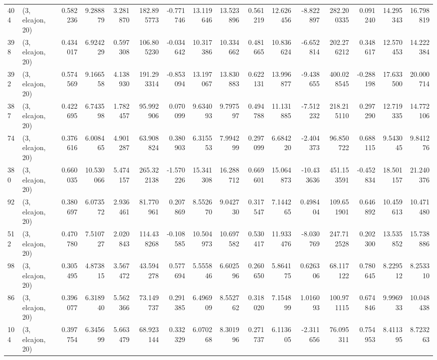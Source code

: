 \begin{tabular}{llrrrrrrrrrrrrrr}
404 &  (3, elcajon, 20) &   0.582236 &   9.288879 &   3.281870 &   182.895773 &  -0.771746 &  13.119646 &  13.523896 &  0.561219 &  12.626456 &  -8.822897 &    282.200335 &   0.091240 &   14.295343 &   16.798819 \\
398 &  (3, elcajon, 20) &   0.434017 &   6.924229 &   0.597308 &   106.805230 &  -0.034642 &  10.317386 &  10.334662 &  0.481665 &  10.836624 &  -6.652814 &    202.276212 &   0.348617 &   12.570453 &   14.222384 \\
392 &  (3, elcajon, 20) &   0.574569 &   9.166558 &   4.138930 &   191.293314 &  -0.853094 &  13.197067 &  13.830883 &  0.622131 &  13.996877 &  -9.438655 &    400.028545 &  -0.288198 &   17.633500 &   20.000714 \\
387 &  (3, elcajon, 20) &   0.422695 &   6.743598 &   1.782457 &    95.992906 &   0.070099 &   9.634093 &   9.797597 &  0.494788 &  11.131885 &  -7.512232 &    218.215110 &   0.297290 &   12.719335 &   14.772106 \\
74  &  (3, elcajon, 20) &   0.376616 &   6.008465 &   4.901287 &    63.908824 &   0.380903 &   6.315553 &   7.994299 &  0.297099 &   6.684220 &  -2.404373 &     96.850722 &   0.688115 &    9.543045 &    9.841276 \\
380 &  (3, elcajon, 20) &   0.660035 &  10.530066 &   5.474157 &   265.322138 &  -1.570226 &  15.341308 &  16.288712 &  0.669601 &  15.064873 & -10.433636 &    451.153591 &  -0.452834 &   18.501157 &   21.240376 \\
92  &  (3, elcajon, 20) &   0.380697 &   6.073572 &   2.936461 &    81.770961 &   0.207869 &   8.552670 &   9.042730 &  0.317547 &   7.144265 &   0.498404 &    109.651901 &   0.646892 &   10.459613 &   10.471480 \\
512 &  (3, elcajon, 20) &   0.470780 &   7.510727 &   2.020843 &   114.438268 &  -0.108585 &  10.504973 &  10.697582 &  0.530417 &  11.933476 &  -8.030769 &    247.712528 &   0.202300 &   13.535852 &   15.738886 \\
98  &  (3, elcajon, 20) &   0.305495 &   4.873815 &   3.567472 &    43.594278 &   0.577694 &   5.555846 &   6.602596 &  0.260650 &   5.864175 &   0.626306 &     68.117122 &   0.780645 &    8.229512 &    8.253310 \\
86  &  (3, elcajon, 20) &   0.396077 &   6.318940 &   5.562366 &    73.149737 &   0.291385 &   6.496909 &   8.552762 &  0.318020 &   7.154899 &   1.016093 &    100.971115 &   0.674846 &    9.996933 &   10.048438 \\
104 &  (3, elcajon, 20) &   0.397754 &   6.345699 &   5.663479 &    68.923144 &   0.332329 &   6.070268 &   8.301996 &  0.271737 &   6.113605 &  -2.311656 &     76.095311 &   0.754953 &    8.411395 &    8.723263 \\

\end{tabular}
